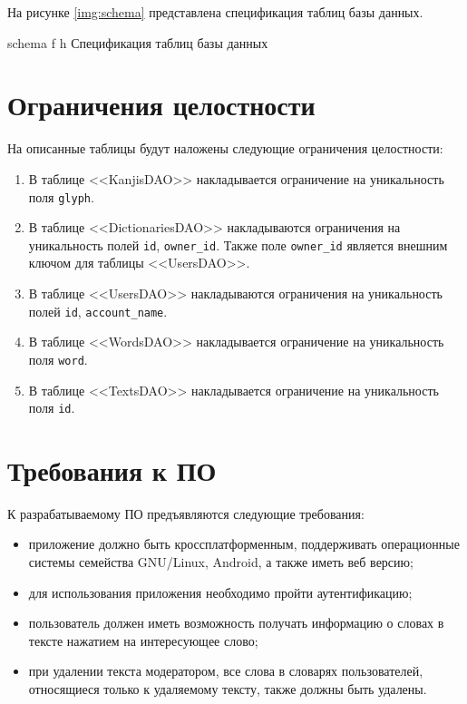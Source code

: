 \clearpage

На рисунке \ref{img:schema} представлена спецификация таблиц базы данных.

    {schema}
    {f}
    {h}
    {\linewidth}
    {Спецификация таблиц базы данных}

\section{Ограничения целостности}

На описанные таблицы будут наложены следующие ограничения целостности:

\begin{enumerate}
    \item В таблице <<KanjisDAO>> накладывается ограничение на уникальность поля \texttt{glyph}. 
    \item В таблице <<DictionariesDAO>> накладываются ограничения на уникальность полей \texttt{id}, \texttt{owner\_id}. Также поле \texttt{owner\_id} является внешним ключом для таблицы <<UsersDAO>>.
    \item В таблице <<UsersDAO>> накладываются ограничения на уникальность полей \texttt{id}, \texttt{account\_name}.
    \item В таблице <<WordsDAO>> накладывается ограничение на уникальность поля \texttt{word}.
    \item В таблице <<TextsDAO>> накладывается ограничение на уникальность поля \texttt{id}.
\end{enumerate}

\section{Требования к ПО}

К разрабатываемому ПО предъявляются следующие требования:

\begin{itemize}[label=---]
    \item приложение должно быть кроссплатформенным, поддерживать операционные системы семейства GNU/Linux, Android, а также иметь веб версию;
    \item для использования приложения необходимо пройти аутентификацию;
    \item пользователь должен иметь возможность получать информацию о словах в тексте нажатием на интересующее слово;
    \item при удалении текста модератором, все слова в словарях пользователей, относящиеся только к удаляемому тексту, также должны быть удалены.
\end{itemize}

